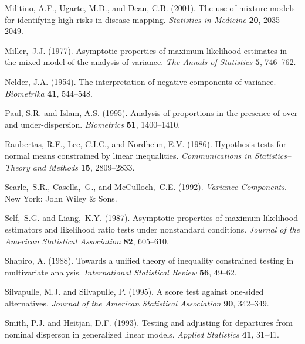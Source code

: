 \documentclass[useAMS,usenatbib,referee]{biom}
\begin{document}
\begin{thebibliography}{}
Militino, A.F., Ugarte, M.D., and Dean, C.B. (2001).
The use of mixture models for identifying high risks in disease mapping.
{\em Statistics in Medicine} {\bfseries 20}, 2035--2049.

Miller,~J.J. (1977).
 Asymptotic properties of maximum likelihood estimates in the mixed model of
  the analysis of variance.
{\em The Annals of Statistics} {\bfseries 5}, 746--762.

Nelder, J.A. (1954).
The interpretation of negative components of variance.
{\em Biometrika} {\bfseries 41}, 544--548.

Paul, S.R. and Islam, A.S. (1995). 
Analysis of proportions in the presence of over- and under-dispersion.
{\em Biometrics} {\bfseries 51}, 1400--1410.

Raubertas, R.F., Lee, C.I.C., and Nordheim, E.V. (1986).
Hypothesis tests for normal means constrained by linear inequalities.
{\em Communications in Statistics--Theory and Methods} {\bfseries 15}, 2809--2833.


Searle,~S.R., Casella,~G., and McCulloch,~C.E. (1992).
{\em Variance Components}.
New York: John Wiley \& Sons. 

Self,~S.G. and Liang,~K.Y. (1987).
Asymptotic properties of maximum likelihood estimators and likelihood ratio
tests under nonstandard conditions.
{\em Journal of the American Statistical Association} {\bfseries 82}, 605--610.

Shapiro, A. (1988).
Towards a unified theory of inequality constrained testing in multivariate analysis.
{\em International Statistical Review} {\bfseries 56}, 49--62.

Silvapulle, M.J. and Silvapulle, P. (1995).
A score test against one-sided alternatives.
{\em Journal of the American Statistical Association} {\bfseries 90}, 342--349.

Smith, P.J. and Heitjan, D.F. (1993). 
Testing and adjusting for departures from nominal disperson in generalized linear models.
{\em Applied Statistics} {\bfseries 41}, 31--41.


\end{thebibliography}
\end{document}
